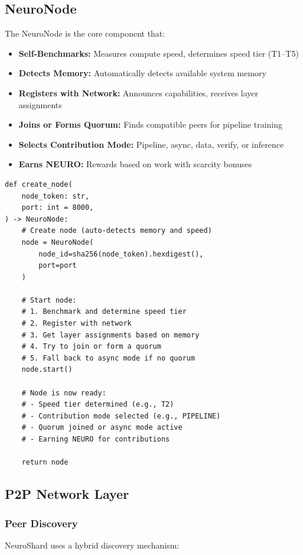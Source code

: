 \documentclass[11pt,a4paper]{article}
\begin{document}
\subsection{NeuroNode}

The NeuroNode is the core component that:

\begin{itemize}
    \item \textbf{Self-Benchmarks:} Measures compute speed, determines speed tier (T1--T5)
    \item \textbf{Detects Memory:} Automatically detects available system memory
    \item \textbf{Registers with Network:} Announces capabilities, receives layer assignments
    \item \textbf{Joins or Forms Quorum:} Finds compatible peers for pipeline training
    \item \textbf{Selects Contribution Mode:} Pipeline, async, data, verify, or inference
    \item \textbf{Earns NEURO:} Rewards based on work with scarcity bonuses
\end{itemize}

\begin{lstlisting}[caption=NeuroNode Initialization]
def create_node(
    node_token: str,
    port: int = 8000,
) -> NeuroNode:
    # Create node (auto-detects memory and speed)
    node = NeuroNode(
        node_id=sha256(node_token).hexdigest(),
        port=port
    )
    
    # Start node:
    # 1. Benchmark and determine speed tier
    # 2. Register with network
    # 3. Get layer assignments based on memory
    # 4. Try to join or form a quorum
    # 5. Fall back to async mode if no quorum
    node.start()
    
    # Node is now ready:
    # - Speed tier determined (e.g., T2)
    # - Contribution mode selected (e.g., PIPELINE)
    # - Quorum joined or async mode active
    # - Earning NEURO for contributions
    
    return node
\end{lstlisting}

\subsection{P2P Network Layer}

\subsubsection{Peer Discovery}
NeuroShard uses a hybrid discovery mechanism:
\end{document}
